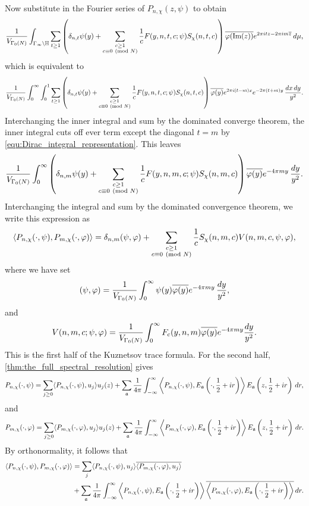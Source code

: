     Now substitute in the Fourier series of $P_{n,\chi}(z,\psi)$ to obtain
    \[
      \frac{1}{V_{\Gamma_{0}(N)}}\int_{\Gamma_{\infty}\backslash\mathbb{H}}\sum_{t \ge 1}\left(\delta_{n,t}\psi(y)+\sum_{\substack{c \ge 1 \\ c \equiv 0 \ \left(\text{mod }N\right)}}\frac{1}{c}F(y,n,t,c;\psi)S_{\chi}(n,t,c)\right)\overline{\varphi(\mathrm{Im}(z))}e^{2\pi itz-2\pi im\overline{z}}\,d\mu,
    \]
    which is equivalent to
    \[
      \frac{1}{V_{\Gamma_{0}(N)}}\int_{0}^{\infty}\int_{0}^{1}\sum_{t \ge 1}\left(\delta_{n,t}\psi(y)+\sum_{\substack{c \ge 1 \\ c \equiv 0 \ \left(\text{mod }N\right)}}\frac{1}{c}F(y,n,t,c;\psi)S_{\chi}(n,t,c)\right)\overline{\varphi(y)}e^{2\pi i(t-m)x}e^{-2\pi(t+m)y}\,\frac{dx\,dy}{y^{2}}.
    \]
    Interchanging the inner integral and sum by the dominated converge theorem, the inner integral cuts off ever term except the diagonal $t = m$ by \cref{equ:Dirac_integral_representation}. This leaves
    \[
      \frac{1}{V_{\Gamma_{0}(N)}}\int_{0}^{\infty}\left(\delta_{n,m}\psi(y)+\sum_{\substack{c \ge 1 \\ c \equiv 0 \ \left(\text{mod }N\right)}}\frac{1}{c}F(y,n,m,c;\psi)S_{\chi}(n,m,c)\right)\overline{\varphi(y)}e^{-4\pi my}\,\frac{dy}{y^{2}}.
    \]
    Interchanging the integral and sum by the dominated convergence theorem, we write this expression as
    \[
      \langle P_{n,\chi}(\cdot,\psi),P_{m,\chi}(\cdot,\varphi)\rangle = \delta_{n,m}(\psi,\varphi)+\sum_{\substack{c \ge 1 \\ c \equiv 0 \ \left(\text{mod }N\right)}}\frac{1}{c}S_{\chi}(n,m,c)V(n,m,c,\psi,\varphi),
    \]
    where we have set
    \[
      (\psi,\varphi) = \frac{1}{V_{\Gamma_{0}(N)}}\int_{0}^{\infty}\psi(y)\overline{\varphi(y)}e^{-4\pi my}\,\frac{dy}{y^{2}},
    \]
    and
    \[
      V(n,m,c;\psi,\varphi) = \frac{1}{V_{\Gamma_{0}(N)}}\int_{0}^{\infty}F_{c}(y,n,m)\overline{\varphi(y)}e^{-4\pi my}\frac{dy}{y^{2}}.
    \]
    This is the first half of the Kuznetsov trace formula. For the second half, \cref{thm:the_full_spectral_resolution} gives
    \[
      P_{n,\chi}(\cdot,\psi) = \sum_{j \ge 0}\langle P_{n,\chi}(\cdot,\psi),u_{j}\rangle u_{j}(z)+\sum_{\mathfrak{a}}\frac{1}{4\pi}\int_{-\infty}^{\infty}\left\langle P_{n,\chi}(\cdot,\psi),E_{\mathfrak{a}}\left(\cdot,\frac{1}{2}+ir\right)\right\rangle E_{\mathfrak{a}}\left(z,\frac{1}{2}+ir\right)\,dr,
    \]
    and
    \[
      P_{m,\chi}(\cdot,\varphi) = \sum_{j \ge 0}\langle P_{m,\chi}(\cdot,\varphi),u_{j}\rangle u_{j}(z)+\sum_{\mathfrak{a}}\frac{1}{4\pi}\int_{-\infty}^{\infty}\left\langle P_{m,\chi}(\cdot,\varphi),E_{\mathfrak{a}}\left(\cdot,\frac{1}{2}+ir\right)\right\rangle E_{\mathfrak{a}}\left(z,\frac{1}{2}+ir\right)\,dr.
    \]
    By orthonormality, it follows that
    \begin{align*}
      \langle P_{n,\chi}(\cdot,\psi),P_{m,\chi}(\cdot,\varphi)\rangle &= \sum_{j}\langle P_{n,\chi}(\cdot,\psi),u_{j}\rangle\overline{\langle P_{m,\chi}(\cdot,\varphi),u_{j}\rangle} \\
      &+\sum_{\mathfrak{a}}\frac{1}{4\pi}\int_{-\infty}^{\infty}\left\langle P_{n,\chi}(\cdot,\psi),E_{\mathfrak{a}}\left(\cdot,\frac{1}{2}+ir\right)\right\rangle\overline{\left\langle P_{m,\chi}(\cdot,\varphi),E_{\mathfrak{a}}\left(\cdot,\frac{1}{2}+ir\right)\right\rangle}\,dr.
    \end{align*}
